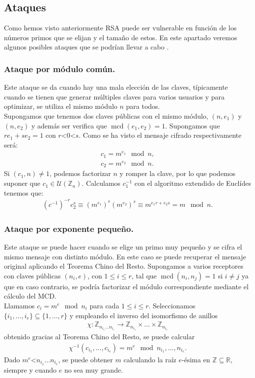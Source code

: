 \subsection{Ataques}
Como hemos visto anteriormente RSA puede ser vulnerable en función de los números primos que se elijan y el tamaño de estos. En este apartado veremos algunos posibles ataques que se podrían llevar a cabo \cite{apuntesCriptografia}.
	\subsubsection{Ataque por módulo común.}
	Este ataque se da cuando hay una mala elección de las claves, típicamente cuando se tienen que generar múltiples claves para varios usuarios y para optimizar, se utiliza el mismo módulo $n$ para todos.\\ 
	Supongamos que tenemos dos claves públicas con el mismo módulo, $(n, e_1)$ y $(n, e_2)$ y además ser verifica que  $\operatorname{mcd}(e_1,e_2)=1$. Supongamos que $re_1+se_2=1$ con $r$\textless $0$\textless $s$. Como se ha visto el mensaje cifrado respectivamente será:
	\begin{align*}
		c_1 = m^{e_1} \mod n,\\
		c_2 = m^{e_2} \mod n.
	\end{align*}
	Si $(c_1,n) \neq 1$, podemos factorizar $n$ y romper la clave, por lo que podemos suponer que $c_1 \in \mathcal{U}(\mathbb{Z}_n)$. Calculamos $c_1^{-1}$ con el algoritmo extendido de Euclídes tenemos que:
	\begin{align*}
			(c^{-1})^{-r}c_2^s \equiv (m^{e_1})^r(m^{e_2})^s \equiv m^{e_1r+e_2s} = m \mod n.
	\end{align*}

	\subsubsection{Ataque por exponente pequeño.}
	Este ataque se puede hacer cuando se elige un primo muy pequeño y se cifra el mismo mensaje con distinto módulo. En este caso se puede recuperar el mensaje original aplicando el Teorema Chino del Resto. Supongamos a varios receptores con claves públicas $(n_i, e)$, con $1\leq i \leq r$, tal que $\operatorname{mcd}(n_i, n_j) = 1$ si $i\neq j$ ya que en caso contrario, se podría factorizar el módulo correspondiente mediante el cálculo del MCD.\\
	Llamamos $c_i = m^e \mod n_i$ para cada $1\leq i \leq r$. Seleccionamos $\{i_1,...,i_e \}\subseteq \{1,...,r\}$ y empleando el inverso del isomorfismo de anillos
	\begin{align*}
		\chi:\mathbb{Z}_{n_{i_1}\dots n_{i_e}}\rightarrow \mathbb{Z}_{n_{i_1}}\times \dots \times \mathbb{Z}_{n_{i_e}}
	\end{align*}
	obtenido gracias al Teorema Chino del Resto, se puede calcular
	\begin{align*}
		\chi^{-1}(c_{i_1},\dots,c_{i_e}) = m^e \mod n_{i_1},\dots,n_{i_e}.
	\end{align*}
	Dado $m^e$\textless $n_{i_1}\dots n_{i_e}$, se puede obtener $m$ calculando la raíz $e$-ésima en $\mathbb{Z} \subseteq \mathbb{R}$, siempre y cuando $e$ no sea muy grande.

